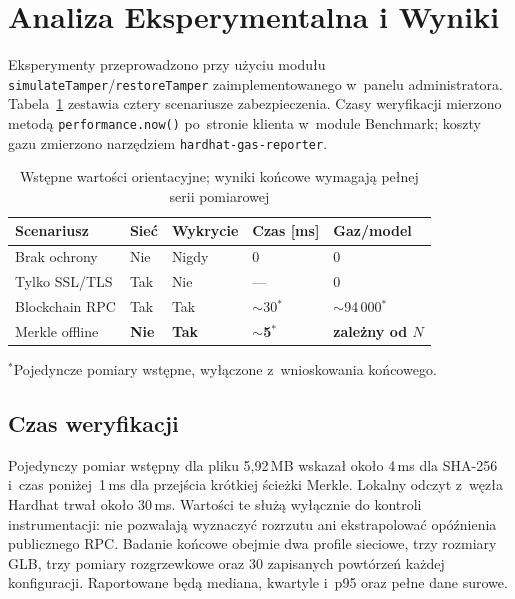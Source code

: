 \documentclass[10pt,conference,a4paper]{IEEEtran}
\begin{document}
\section{Analiza Eksperymentalna i Wyniki}

Eksperymenty przeprowadzono przy użyciu modułu
\texttt{simulateTamper}/\texttt{restoreTamper} zaimplementowanego
w~panelu administratora. Tabela~\ref{tab:scenarios} zestawia
cztery scenariusze zabezpieczenia. Czasy weryfikacji mierzono
metodą \texttt{performance.now()} po~stronie klienta w~module
Benchmark; koszty gazu zmierzono narzędziem
\texttt{hardhat-gas-reporter}.

\begin{table}[htbp]
\caption{Wstępne wartości orientacyjne; wyniki końcowe wymagają pełnej serii pomiarowej}
\label{tab:scenarios}
\centering
\renewcommand{\arraystretch}{1.2}
\begin{tabular}{p{1.25cm}p{0.9cm}p{0.95cm}p{1.1cm}p{1.15cm}}
\toprule
\textbf{Scenariusz} & \textbf{Sieć} & \textbf{Wykrycie} &
\textbf{Czas [ms]} & \textbf{Gaz/model} \\
\midrule
Brak ochrony   & Nie  & Nigdy & 0          & 0           \\
Tylko SSL/TLS  & Tak  & Nie   & —          & 0           \\
Blockchain RPC & Tak  & Tak   & $\sim$30$^*$   & $\sim$94\,000$^*$ \\
Merkle offline & \textbf{Nie} & \textbf{Tak} &
                 \textbf{$\sim$5$^*$} & \textbf{zależny od $N$} \\
\bottomrule
\end{tabular}
{\footnotesize $^*$Pojedyncze pomiary wstępne, wyłączone
z~wnioskowania końcowego.}
\end{table}

\subsection{Czas weryfikacji}

Pojedynczy pomiar wstępny dla pliku 5,92\,MB wskazał około
4\,ms dla SHA-256 i~czas poniżej~1\,ms dla przejścia krótkiej
ścieżki Merkle. Lokalny odczyt z~węzła Hardhat trwał około
30\,ms. Wartości te służą wyłącznie do kontroli instrumentacji:
nie pozwalają wyznaczyć rozrzutu ani ekstrapolować opóźnienia
publicznego RPC. Badanie końcowe obejmie dwa profile sieciowe,
trzy rozmiary GLB, trzy pomiary rozgrzewkowe oraz 30 zapisanych
powtórzeń każdej konfiguracji. Raportowane będą mediana,
kwartyle i~p95 oraz pełne dane surowe.
\end{document}

